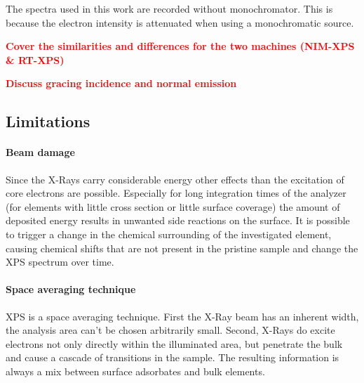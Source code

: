 The spectra used in this work are recorded without monochromator. This is because the electron intensity is attenuated when using a monochromatic source.

\textcolor{red}{\textbf{Cover the similarities and differences for the two machines (NIM-XPS \& RT-XPS)}}

\textcolor{red}{\textbf{Discuss gracing incidence and normal emission}}

\subsection{Limitations}
\paragraph{Beam damage}
Since the X-Rays carry considerable energy other effects than the excitation of core electrons are possible. Especially for long integration times of the analyzer (for elements with little cross section or little surface coverage) the amount of deposited energy results in unwanted side reactions on the surface. It is possible to trigger a change in the chemical surrounding of the investigated element, causing chemical shifts that are not present in the pristine sample and change the XPS spectrum over time.

\paragraph{Space averaging technique}
XPS is a space averaging technique. First the X-Ray beam has an inherent width, the analysis area can't be chosen arbitrarily small. Second, X-Rays do excite electrons not only directly within the illuminated area, but penetrate the bulk and cause a cascade of transitions in the sample. The resulting information is always a mix between surface adsorbates and bulk elements.